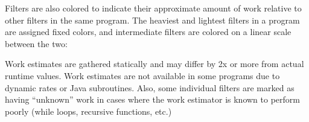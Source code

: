 Filters are also colored to indicate their approximate amount of work
relative to other filters in the same program.  The heaviest and
lightest filters in a program are assigned fixed colors, and
intermediate filters are colored on a linear scale between the two:

\begin{center}
\end{center}

\noindent Work estimates are gathered statically and may differ by 2x 
or more from actual runtime values.  Work estimates are not available
in some programs due to dynamic rates or Java subroutines.  Also, some
individual filters are marked as having ``unknown'' work in cases
where the work estimator is known to perform poorly (while loops,
recursive functions, etc.)

\enlargethispage{0.25\baselineskip}


\newcommand{\tallgraphcustom}[3]{
\clearpage
\begin{figure}[t!]
\vspace{-12pt}
\centering
\psfig{file=apps/#1.eps,height=\textheight}
\vspace{#3}
\caption{Stream graph for #2.\protect\label{fig:#1-graph}}
\vspace{-12pt}
\end{figure}}

\newcommand{\tallgraph}[2]{\tallgraphcustom{#1}{#2}{-12pt}}

\newcommand{\widegraph}[2]{
\clearpage
\begin{figure}[t!]
\vspace{-12pt}
\hspace{-0.025\textwidth}\psfig{file=apps/#1.eps,width=1.05\textwidth}
\vspace{-12pt}
\caption{Stream graph for #2.\protect\label{fig:#1-graph}}
\vspace{-12pt}
\end{figure}}

\newcommand{\smallgraph}[2]{
\clearpage
\begin{figure}[t!]
\vspace{-12pt}
\centering
\psfig{file=apps/#1.eps,scale=0.7}
\vspace{-12pt}
\caption{Stream graph for #2.\protect\label{fig:#1-graph}}
\vspace{-12pt}
\end{figure}}

